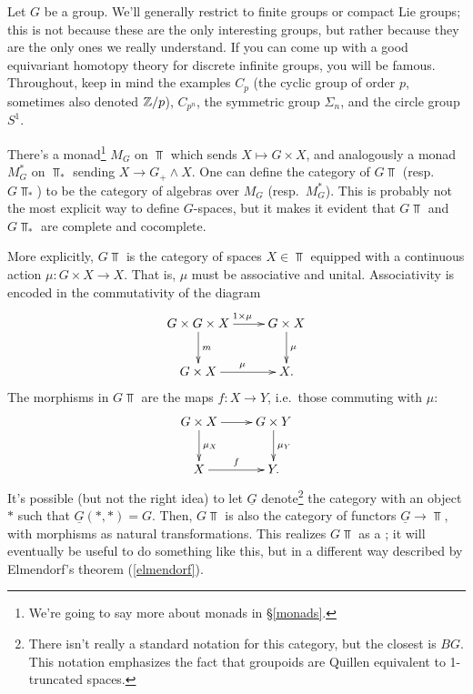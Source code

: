 Let $G$ be a group. We'll generally restrict to finite groups or compact Lie groups; this is not because these are
the only interesting groups, but rather because they are the only ones we really understand. If you can come up
with a good equivariant homotopy theory for discrete infinite groups, you will be famous. Throughout, keep in mind
the examples $C_p$ (the cyclic group of order $p$, sometimes also denoted $\mathbb Z/p$), $C_{p^n}$, the symmetric group
$\Sigma_n$, and the circle group $S^1$.

There's a monad\footnote{We're going to say more about monads in \S\ref{monads}.} $M_G$ on $\Top$ which sends
$X\mapsto G\times X$, and analogously a monad $M_G^*$ on $\Top_*$ sending $X\to G_+\land X$. One can define the
category of  $G\Top$ (resp.\  $G\Top_*$) to be the category of algebras
over $M_G$ (resp.\ $M_G^*$). This is probably not the most explicit way to define $G$-spaces, but it makes it
evident that $G\Top$ and $G\Top_*$ are complete and cocomplete.

More explicitly, $G\Top$ is the category of spaces $X\in\Top$ equipped with a continuous action $\mu\colon G\times
X\to X$. That is, $\mu$ must be associative and unital. Associativity is encoded in the commutativity of the
diagram
\[\xymatrix{
	G\times G\times X\ar[r]^{1\times\mu}\ar[d]^m & G\times X\ar[d]^\mu\\
	G\times X\ar[r]^\mu & X.
}\]
The morphisms in $G\Top$ are the  maps $f\colon X\to Y$, i.e.\ those commuting with $\mu$:
\[\xymatrix{
	G\times X\ar[r]\ar[d]^{\mu_X} & G\times Y\ar[d]^{\mu_Y}\\
	X\ar[r]^f & Y.
}\]
It's possible (but not the right idea) to let $\underline G$ denote\footnote{There isn't really a standard notation for this category, but the closest is $BG$. This notation emphasizes the fact that groupoids are Quillen equivalent to 1-truncated spaces.} the category with an object $*$ such that
$\underline G(*, *) = G$. Then, $G\Top$ is also the category of functors $\underline G\to\Top$, with morphisms as
natural transformations. This realizes $G\Top$ as a ; it will eventually be useful to do
something like this, but in a different way described by Elmendorf's theorem (\cref{elmendorf}).

